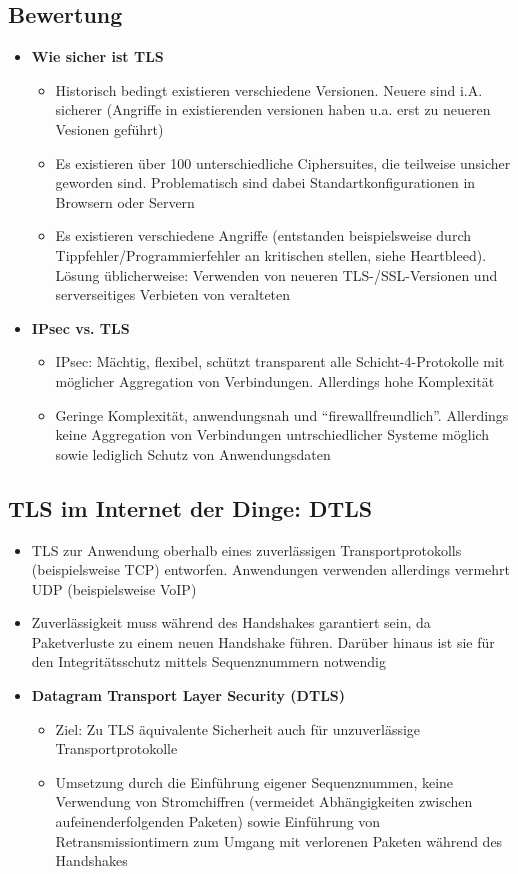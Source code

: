 \subsection{Bewertung}
\begin{itemize}
	\item \textbf{Wie sicher ist TLS}
	\begin{itemize}
		\item Historisch bedingt existieren verschiedene Versionen. Neuere sind i.A. sicherer (Angriffe in existierenden versionen haben u.a. erst zu neueren Vesionen geführt)
		\item Es existieren über 100 unterschiedliche Ciphersuites, die teilweise unsicher geworden sind. Problematisch sind dabei Standartkonfigurationen in Browsern oder Servern
		\item Es existieren verschiedene Angriffe (entstanden beispielsweise durch Tippfehler/Programmierfehler an kritischen stellen, siehe Heartbleed). Lösung üblicherweise: Verwenden von neueren TLS-/SSL-Versionen und serverseitiges Verbieten von veralteten
	\end{itemize}
	\item \textbf{IPsec vs. TLS}
	\begin{itemize}
		\item IPsec: Mächtig, flexibel, schützt transparent alle Schicht-4-Protokolle mit möglicher Aggregation von Verbindungen. Allerdings hohe Komplexität
		\item Geringe Komplexität, anwendungsnah und "`firewallfreundlich"'. Allerdings keine Aggregation von Verbindungen untrschiedlicher Systeme möglich sowie lediglich Schutz von Anwendungsdaten
	\end{itemize}
\end{itemize}


\subsection{TLS im Internet der Dinge: DTLS}
\begin{itemize}
	\item TLS zur Anwendung oberhalb eines zuverlässigen Transportprotokolls (beispielsweise TCP) entworfen. Anwendungen verwenden allerdings vermehrt UDP (beispielsweise VoIP)
	\item Zuverlässigkeit muss während des Handshakes garantiert sein, da Paketverluste zu einem neuen Handshake führen. Darüber hinaus ist sie für den Integritätsschutz mittels Sequenznummern notwendig
	\item \textbf{Datagram Transport Layer Security (DTLS)}
	\begin{itemize}
		\item Ziel: Zu TLS äquivalente Sicherheit auch für unzuverlässige Transportprotokolle
		\item Umsetzung durch die Einführung eigener Sequenznummen, keine Verwendung von Stromchiffren (vermeidet Abhängigkeiten zwischen aufeinenderfolgenden Paketen) sowie Einführung von Retransmissiontimern zum Umgang mit verlorenen Paketen während des Handshakes
	\end{itemize}
\end{itemize}




